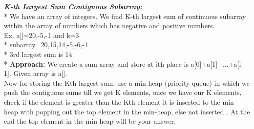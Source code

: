 \documentclass[12pt]{book}
\begin{document}
\textbf{\textit{K-th Largest Sum Contiguous Subarray:}} \\*
We have an array of integers. We find K-th largest sum of continuous subarray within the array of numbers which has negative and positive numbers.\\
\newline
Ex. a[]={20,-5,-1} and k=3 \\*
    subarray={20,15,14,-5,-6,-1} \\*
    3rd largest sum is 14   \\*
\textbf{Approach:} We create a sum array and store at ith place is a[0]+a[1]+...+a[i-1]. Given array is a[]. \\
Now for storing the Kth largest sum, use a min heap (priority queue) in which we push the contiguous sums till we get K elements, once we have our K elements, check if the element is greater than the Kth element it is inserted to the min heap with popping out the top element in the min-heap, else not inserted . At the end the top element in the min-heap will be your answer. \\
\end{document}
